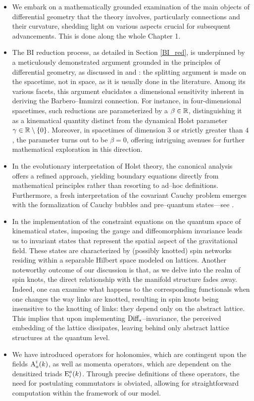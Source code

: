 \begin{itemize}
\item We embark on a mathematically grounded examination of the main objects of differential geometry that the theory involves, particularly connections and their curvature, shedding light on various aspects crucial for subsequent advancements. This is done along the whole Chapter 1.
\item The BI reduction process, as detailed in Section \ref{BI_red}, is underpinned by a meticulously demonstrated argument grounded in the principles of differential geometry, as discussed in \cite{kobayashi1} and \cite{Orizzonte}: the splitting argument is made on the spacetime, not in space, as it is usually done in the literature. Among its various facets, this argument elucidates a dimensional sensitivity inherent in deriving the Barbero--Immirzi connection. For instance, in four-dimensional spacetimes, such reductions are parameterized by a $\beta\in\mathbb{R}$, distinguishing it as a kinematical quantity distinct from the dynamical Holst parameter $\gamma\in\mathbb{R}\setminus\{0\}$. Moreover, in spacetimes of dimension $3$ or strictly greater than $4$, the parameter turns out to be $\beta=0$, offering intriguing avenues for further mathematical exploration in this direction.
\item In the evolutionary interpretation of Holst theory, the canonical analysis offers a refined approach, yielding boundary equations directly from mathematical principles rather than resorting to ad--hoc definitions. Furthermore, a fresh interpretation of the covariant Cauchy problem emerges with the formalization of Cauchy bubbles and pre--quantum states---see \cite{LN2}.
\item In the implementation of the constraint equations on the quantum space of kinematical states, imposing the gauge and diffeomorphism invariance leads us to invariant states that represent the spatial aspect of the gravitational field. These states are characterized by (possibly knotted) spin networks residing within a separable Hilbert space modeled on lattices. Another noteworthy outcome of our discussion is that, as we delve into the realm of spin knots, the direct relationship with the manifold structure fades away. {Indeed, one can examine what happens to the corresponding functionals when one changes the way links are knotted, resulting in spin knots being insensitive to the knotting of links: they depend only on the abstract lattice. This implies that upon implementing $\text{\normalfont Diff}_*$--invariance, the perceived embedding of the lattice dissipates, leaving behind only abstract lattice structures at the quantum level}.

\item We have introduced operators for holonomies, which are contingent upon the fields $\text{\normalfont A}^i_a(k)$, as well as momenta operators, which are dependent on the densitized triads $\text{\normalfont E}^a_i(k)$. Through precise definitions of these operators, the need for postulating commutators is obviated, allowing for straightforward computation within the framework of our model.
  
\end{itemize} 
